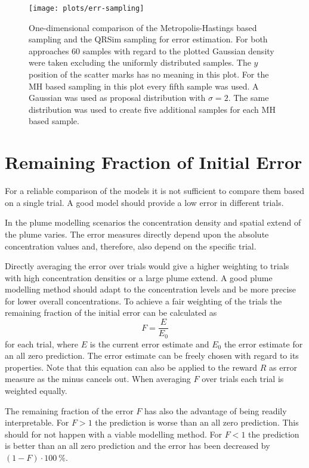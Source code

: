 \begin{figure}
    \centering
    \texttt{[image: plots/err-sampling]}
    \caption[Comparison of error estimation sampling methods]{One-dimensional 
        comparison of the Metropolis-Hastings based sampling and the QRSim 
        sampling for error estimation. For both approaches 60 samples with 
        regard to the plotted Gaussian density were taken excluding the 
        uniformly distributed samples.  The $y$ position of the scatter marks 
        has no meaning in this plot. For the MH based sampling in this plot 
        every fifth sample was used.  A Gaussian was used as proposal 
        distribution with $\sigma = 2$.  The same distribution was used to 
        create five additional samples for each MH based 
        sample.}\label{fig:err-sampling}
\end{figure}

\section{Remaining Fraction of Initial Error}
For a reliable comparison of the models it is not sufficient to compare them 
based on a single trial. A good model should provide a low error in different 
trials.

In the plume modelling scenarios the concentration density and spatial extend of 
the plume varies. The error measures directly depend upon the absolute 
concentration values and, therefore, also depend on the specific trial.

Directly averaging the error over trials would give a higher weighting to trials 
with high concentration densities or a large plume extend. A good plume 
modelling method should adapt to the concentration levels and be more precise 
for lower overall concentrations. To achieve a fair weighting of the trials the 
remaining fraction of the initial error can be calculated as
\begin{equation}
    F = \frac{E}{E_0}
\end{equation}
for each trial, where $E$ is the current error estimate and $E_0$ the error 
estimate for an all zero prediction. The error estimate can be freely chosen 
with regard to its properties. Note that this equation can also be applied to 
the reward $R$ as error measure as the minus cancels out. When averaging $F$ 
over trials each trial is weighted equally.

The remaining fraction of the error $F$ has also the advantage of being readily 
interpretable. For $F > 1$ the prediction is worse than an all zero prediction.  
This should for not happen with a viable modelling method. For $F < 1$ the 
prediction is better than an all zero prediction and the error has been 
decreased by $(1 - F) \cdot \SI{100}{\percent}$.
